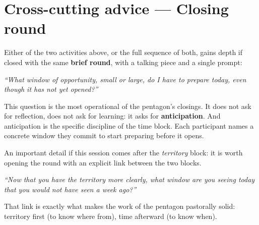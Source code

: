 \documentclass[11pt, a4paper]{article}
\begin{document}
\section*{Cross-cutting advice --- Closing round}

Either of the two activities above, or the full sequence of both, gains depth if closed with the same \textbf{brief round}, with a talking piece and a single prompt:

\vspace{0.5em}

\begin{center}
\begin{tcolorbox}[
  enhanced, colback=tiempoAmbar, colframe=tiempoAmbar,
  boxrule=0pt, arc=3pt,
  left=18pt, right=18pt, top=16pt, bottom=16pt,
  width=0.86\linewidth,
  halign=center
]
  {\color{parch}\itshape\large ``What window of opportunity, small or large, do I have to prepare today, even though it has not yet opened?''}
\end{tcolorbox}
\end{center}

\vspace{0.5em}

This question is the most operational of the pentagon's closings. It does not ask for reflection, does not ask for learning: it asks for \textbf{anticipation}. And anticipation is the specific discipline of the time block. Each participant names a concrete window they commit to start preparing before it opens.

An important detail if this session comes after the \emph{territory} block: it is worth opening the round with an explicit link between the two blocks.

\begin{center}
\begin{tcolorbox}[
  enhanced, colback=white, colframe=tiempoAmbar,
  boxrule=0.8pt, arc=2pt,
  left=14pt, right=14pt, top=10pt, bottom=10pt,
  width=0.9\linewidth,
]
  {\color{tinte}\itshape ``Now that you have the territory more clearly, what window are you seeing today that you would not have seen a week ago?''}
\end{tcolorbox}
\end{center}

That link is exactly what makes the work of the pentagon pastorally solid: territory first (to know where from), time afterward (to know when).
\end{document}
